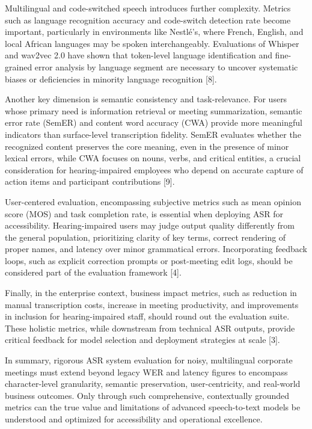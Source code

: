 \documentclass[12pt,a4paper]{article}
\begin{document}
Multilingual and code-switched speech introduces further complexity. Metrics such as language recognition accuracy and code-switch detection rate become important, particularly in environments like Nestlé’s, where French, English, and local African languages may be spoken interchangeably. Evaluations of Whisper and wav2vec 2.0 have shown that token-level language identification and fine-grained error analysis by language segment are necessary to uncover systematic biases or deficiencies in minority language recognition [8].


Another key dimension is semantic consistency and task-relevance. For users whose primary need is information retrieval or meeting summarization, semantic error rate (SemER) and content word accuracy (CWA) provide more meaningful indicators than surface-level transcription fidelity. SemER evaluates whether the recognized content preserves the core meaning, even in the presence of minor lexical errors, while CWA focuses on nouns, verbs, and critical entities, a crucial consideration for hearing-impaired employees who depend on accurate capture of action items and participant contributions [9].


User-centered evaluation, encompassing subjective metrics such as mean opinion score (MOS) and task completion rate, is essential when deploying ASR for accessibility. Hearing-impaired users may judge output quality differently from the general population, prioritizing clarity of key terms, correct rendering of proper names, and latency over minor grammatical errors. Incorporating feedback loops, such as explicit correction prompts or post-meeting edit logs, should be considered part of the evaluation framework [4].


Finally, in the enterprise context, business impact metrics, such as reduction in manual transcription costs, increase in meeting productivity, and improvements in inclusion for hearing-impaired staff, should round out the evaluation suite. These holistic metrics, while downstream from technical ASR outputs, provide critical feedback for model selection and deployment strategies at scale [3].


In summary, rigorous ASR system evaluation for noisy, multilingual corporate meetings must extend beyond legacy WER and latency figures to encompass character-level granularity, semantic preservation, user-centricity, and real-world business outcomes. Only through such comprehensive, contextually grounded metrics can the true value and limitations of advanced speech-to-text models be understood and optimized for accessibility and operational excellence.
\end{document}
